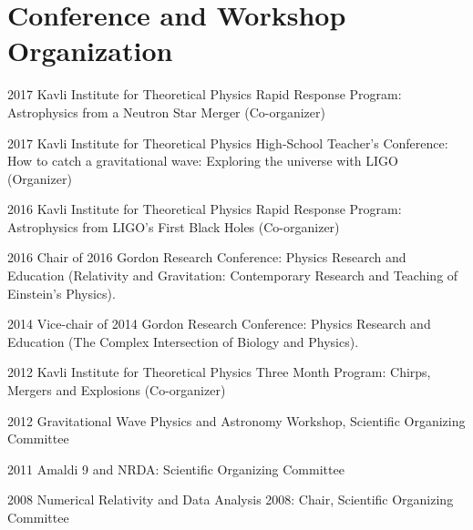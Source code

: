\documentclass{cv}
\begin{document}
\section{Conference and Workshop Organization}
\begin{entry}
  \item[{2017}] Kavli Institute for Theoretical Physics Rapid Response Program:
  Astrophysics from a Neutron Star Merger (Co-organizer)
  \item[{2017}] Kavli Institute for Theoretical Physics High-School Teacher's Conference:
  How to catch a gravitational wave: Exploring the universe with LIGO (Organizer)
  \item[{2016}] Kavli Institute for Theoretical Physics Rapid Response Program:
  Astrophysics from LIGO’s First Black Holes (Co-organizer)
  \item[{2016}] Chair of 2016 Gordon Research
  Conference: Physics Research and Education (Relativity and Gravitation: Contemporary Research and Teaching of Einstein's Physics).
  \item[{2014}] Vice-chair of 2014 Gordon Research
  Conference: Physics Research and Education (The Complex Intersection of Biology and Physics).
  \item[{2012}] Kavli Institute for Theoretical Physics Three
  Month Program: Chirps, Mergers and Explosions (Co-organizer)
  \item[{2012}] Gravitational Wave Physics and Astronomy Workshop, Scientific
  Organizing Committee
  \item[{2011}] Amaldi 9 and NRDA: Scientific Organizing Committee
  \item[2008] { Numerical Relativity and Data Analysis 2008: Chair, Scientific Organizing Committee}
\end{entry}

\end{document}
